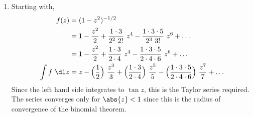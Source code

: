 \begin{enumerate}
    \item Starting with,
          \begin{align}
              f(z)          & = (1 - z^2)^{-1/2}                                     \\
                            & = 1 - \frac{z^2}{2} + \frac{1 \cdot 3}{2^2\ 2!}\ z^4 -
              \frac{1 \cdot 3 \cdot 5}{2^3\ 3!}\ z^6 + \dots                         \\
                            & = 1 - \frac{z^2}{2} + \frac{1 \cdot 3}{2 \cdot 4}\ z^4
              - \frac{1 \cdot 3 \cdot 5}{2 \cdot 4 \cdot 6}\ z^6 + \dots             \\
              \int f\ \dl z & = z - \Bigl(\frac{1}{2}\Bigr)\ \frac{z^3}{3} +
              \Bigl(\frac{1 \cdot 3}{2 \cdot 4}\Bigr)\ \frac{z^5}{5}
              - \Bigl(\frac{1 \cdot 3 \cdot 5}{2 \cdot 4 \cdot 6}\Bigr)
              \ \frac{z^7}{7} + \dots
          \end{align}
          Since the left hand side integrates to $ \tan z $, this is the Taylor series
          required. The series converges only for $ \abs{z} < 1 $ since this is the
          radius of convergence of the binomial theorem.


\end{enumerate}
